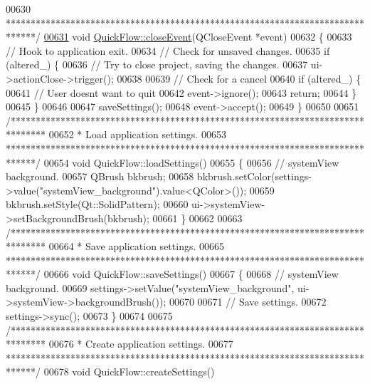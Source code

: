 \begin{DoxyCode}
00630 \textcolor{comment}{ ******************************************************************************/}
\hypertarget{quickflow_8cpp_source_l00631}{}\hyperlink{group___window_gac8cc1bb329961a0781ffed7b6f2ab402}{00631} \textcolor{keywordtype}{void} \hyperlink{group___window_gac8cc1bb329961a0781ffed7b6f2ab402}{QuickFlow::closeEvent}(QCloseEvent *event)
00632 \{
00633   \textcolor{comment}{// Hook to application exit.}
00634   \textcolor{comment}{// Check for unsaved changes.}
00635   \textcolor{keywordflow}{if} (altered\_) \{
00636     \textcolor{comment}{// Try to close project, saving the changes.}
00637     ui->actionClose->trigger();
00638 
00639     \textcolor{comment}{// Check for a  cancel}
00640     \textcolor{keywordflow}{if} (altered\_) \{
00641       \textcolor{comment}{// User doesnt want to quit}
00642       \textcolor{keyword}{event}->ignore();
00643       \textcolor{keywordflow}{return};
00644     \}
00645   \}
00646 
00647   saveSettings();
00648   \textcolor{keyword}{event}->accept();
00649 \}
00650 
00651 \textcolor{comment}{/*******************************************************************************}
00652 \textcolor{comment}{ * Load application settings.}
00653 \textcolor{comment}{ ******************************************************************************/}
00654 \textcolor{keywordtype}{void} QuickFlow::loadSettings()
00655 \{
00656   \textcolor{comment}{// systemView background.}
00657   QBrush bkbrush;
00658   bkbrush.setColor(settings->value(\textcolor{stringliteral}{"systemView\_background"}).value<QColor>());
00659   bkbrush.setStyle(Qt::SolidPattern);
00660   ui->systemView->setBackgroundBrush(bkbrush);
00661 \}
00662 
00663 \textcolor{comment}{/*******************************************************************************}
00664 \textcolor{comment}{ * Save application settings.}
00665 \textcolor{comment}{ ******************************************************************************/}
00666 \textcolor{keywordtype}{void} QuickFlow::saveSettings()
00667 \{
00668   \textcolor{comment}{// systemView background.}
00669   settings->setValue(\textcolor{stringliteral}{"systemView\_background"}, ui->systemView->backgroundBrush());
00670 
00671   \textcolor{comment}{// Save settings.}
00672   settings->sync();
00673 \}
00674 
00675 \textcolor{comment}{/*******************************************************************************}
00676 \textcolor{comment}{ * Create application settings.}
00677 \textcolor{comment}{ ******************************************************************************/}
00678 \textcolor{keywordtype}{void} QuickFlow::createSettings()

\end{DoxyCode}
